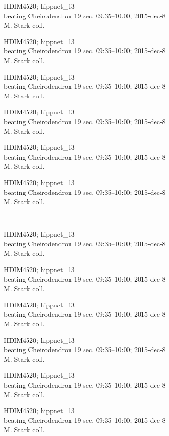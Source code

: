 \documentclass[2pt]{extarticle}
\begin{document}
\noindent
\raggedright
\parbox{0.16\textwidth}{\tiny \raggedright \rule[-0.3\baselineskip]{0pt}{10pt}HDIM4520; hippnet\_13\\ beating Cheirodendron 19 sec. 09:35--10:00; 2015-dec-8\\ M. Stark coll.}
\parbox{0.16\textwidth}{\tiny \raggedright \rule[-0.3\baselineskip]{0pt}{10pt}HDIM4520; hippnet\_13\\ beating Cheirodendron 19 sec. 09:35--10:00; 2015-dec-8\\ M. Stark coll.}
\parbox{0.16\textwidth}{\tiny \raggedright \rule[-0.3\baselineskip]{0pt}{10pt}HDIM4520; hippnet\_13\\ beating Cheirodendron 19 sec. 09:35--10:00; 2015-dec-8\\ M. Stark coll.}
\parbox{0.16\textwidth}{\tiny \raggedright \rule[-0.3\baselineskip]{0pt}{10pt}HDIM4520; hippnet\_13\\ beating Cheirodendron 19 sec. 09:35--10:00; 2015-dec-8\\ M. Stark coll.}
\parbox{0.16\textwidth}{\tiny \raggedright \rule[-0.3\baselineskip]{0pt}{10pt}HDIM4520; hippnet\_13\\ beating Cheirodendron 19 sec. 09:35--10:00; 2015-dec-8\\ M. Stark coll.}
\parbox{0.16\textwidth}{\tiny \raggedright \rule[-0.3\baselineskip]{0pt}{10pt}HDIM4520; hippnet\_13\\ beating Cheirodendron 19 sec. 09:35--10:00; 2015-dec-8\\ M. Stark coll.} \\ 
\vspace{0.001in} 

\noindent
\parbox{0.16\textwidth}{\tiny \raggedright \rule[-0.3\baselineskip]{0pt}{10pt}HDIM4520; hippnet\_13\\ beating Cheirodendron 19 sec. 09:35--10:00; 2015-dec-8\\ M. Stark coll.}
\parbox{0.16\textwidth}{\tiny \raggedright \rule[-0.3\baselineskip]{0pt}{10pt}HDIM4520; hippnet\_13\\ beating Cheirodendron 19 sec. 09:35--10:00; 2015-dec-8\\ M. Stark coll.}
\parbox{0.16\textwidth}{\tiny \raggedright \rule[-0.3\baselineskip]{0pt}{10pt}HDIM4520; hippnet\_13\\ beating Cheirodendron 19 sec. 09:35--10:00; 2015-dec-8\\ M. Stark coll.}
\parbox{0.16\textwidth}{\tiny \raggedright \rule[-0.3\baselineskip]{0pt}{10pt}HDIM4520; hippnet\_13\\ beating Cheirodendron 19 sec. 09:35--10:00; 2015-dec-8\\ M. Stark coll.}
\parbox{0.16\textwidth}{\tiny \raggedright \rule[-0.3\baselineskip]{0pt}{10pt}HDIM4520; hippnet\_13\\ beating Cheirodendron 19 sec. 09:35--10:00; 2015-dec-8\\ M. Stark coll.}
\parbox{0.16\textwidth}{\tiny \raggedright \rule[-0.3\baselineskip]{0pt}{10pt}HDIM4520; hippnet\_13\\ beating Cheirodendron 19 sec. 09:35--10:00; 2015-dec-8\\ M. Stark coll.} \\ 
\vspace{0.001in} 
\end{document}
